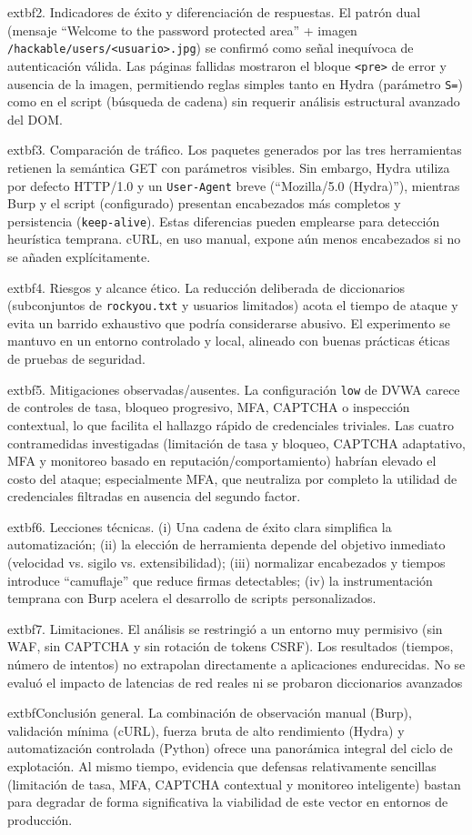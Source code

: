 \documentclass[letterpaper,12pt]{article}
\begin{document}
	extbf{2. Indicadores de éxito y diferenciación de respuestas.} El patrón dual (mensaje “Welcome to the password protected area” + imagen \texttt{/hackable/users/<usuario>.jpg}) se confirmó como señal inequívoca de autenticación válida. Las páginas fallidas mostraron el bloque \texttt{<pre>} de error y ausencia de la imagen, permitiendo reglas simples tanto en Hydra (parámetro \texttt{S=}) como en el script (búsqueda de cadena) sin requerir análisis estructural avanzado del DOM.

	extbf{3. Comparación de tráfico.} Los paquetes generados por las tres herramientas retienen la semántica GET con parámetros visibles. Sin embargo, Hydra utiliza por defecto HTTP/1.0 y un \texttt{User-Agent} breve (“Mozilla/5.0 (Hydra)”), mientras Burp y el script (configurado) presentan encabezados más completos y persistencia (\texttt{keep-alive}). Estas diferencias pueden emplearse para detección heurística temprana. cURL, en uso manual, expone aún menos encabezados si no se añaden explícitamente.

	extbf{4. Riesgos y alcance ético.} La reducción deliberada de diccionarios (subconjuntos de \texttt{rockyou.txt} y usuarios limitados) acota el tiempo de ataque y evita un barrido exhaustivo que podría considerarse abusivo. El experimento se mantuvo en un entorno controlado y local, alineado con buenas prácticas éticas de pruebas de seguridad.

	extbf{5. Mitigaciones observadas/ausentes.} La configuración \texttt{low} de DVWA carece de controles de tasa, bloqueo progresivo, MFA, CAPTCHA o inspección contextual, lo que facilita el hallazgo rápido de credenciales triviales. Las cuatro contramedidas investigadas (limitación de tasa y bloqueo, CAPTCHA adaptativo, MFA y monitoreo basado en reputación/comportamiento) habrían elevado el costo del ataque; especialmente MFA, que neutraliza por completo la utilidad de credenciales filtradas en ausencia del segundo factor.

	extbf{6. Lecciones técnicas.} (i) Una cadena de éxito clara simplifica la automatización; (ii) la elección de herramienta depende del objetivo inmediato (velocidad vs. sigilo vs. extensibilidad); (iii) normalizar encabezados y tiempos introduce “camuflaje” que reduce firmas detectables; (iv) la instrumentación temprana con Burp acelera el desarrollo de scripts personalizados.

	extbf{7. Limitaciones.} El análisis se restringió a un entorno muy permisivo (sin WAF, sin CAPTCHA y sin rotación de tokens CSRF). Los resultados (tiempos, número de intentos) no extrapolan directamente a aplicaciones endurecidas. No se evaluó el impacto de latencias de red reales ni se probaron diccionarios avanzados

	extbf{Conclusión general.} La combinación de observación manual (Burp), validación mínima (cURL), fuerza bruta de alto rendimiento (Hydra) y automatización controlada (Python) ofrece una panorámica integral del ciclo de explotación. Al mismo tiempo, evidencia que defensas relativamente sencillas (limitación de tasa, MFA, CAPTCHA contextual y monitoreo inteligente) bastan para degradar de forma significativa la viabilidad de este vector en entornos de producción.
\end{document}

